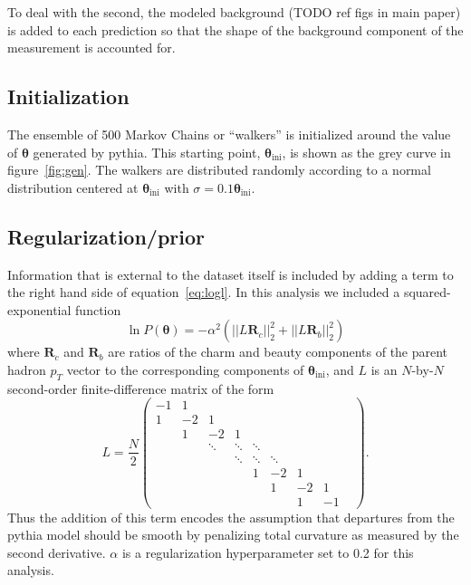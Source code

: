 \documentclass[12pt]{article}
\newcommand{\rvec}{\mathbf{R}}
\newcommand{\thetavec}{\mathbf{\theta}}
\newcommand{\prior}{P(\thetavec)}
\begin{document}
To deal with the second, the modeled background (TODO ref figs in main paper) is added to each prediction so that the shape of the background component of the measurement is accounted for.

\subsection{Initialization} \label{sec:mcmc-init}
The ensemble of 500 Markov Chains or ``walkers'' is initialized around the value of $\thetavec$ generated by pythia. This starting point, $\thetavec_{\mathrm{ini}}$, is shown as the grey curve in figure~\ref{fig:gen}. The walkers are distributed randomly according to a normal distribution centered at $\thetavec_{\mathrm{ini}}$ with $\sigma = 0.1 \thetavec_{\mathrm{ini}}$.

\subsection{Regularization/prior}
Information that is external to the dataset itself is included by adding a term to the right hand side of equation~\ref{eq:logl}. In this analysis we included a squared-exponential function
\begin{equation} \label{eq:l2reg}
  \ln \prior = -\alpha^2 \left(||L \rvec_c||_2^2 + ||L \rvec_b||_2^2\right)
\end{equation}
where $\rvec_c$ and $\rvec_b$ are ratios of the charm and beauty components of the parent hadron $p_T$ vector to the corresponding components of $\thetavec_{\mathrm{ini}}$, and $L$ is an $N$-by-$N$ second-order finite-difference matrix of the form
\begin{equation} \label{eq:lmatrix}
L = \frac{N}{2}
\begin{pmatrix}
-1 & 1 & & & & & &\\
1 & -2 & 1 & & & & &\\
& 1 & -2 & 1 & & & &\\

& & \ddots & \ddots & \ddots & & & &\\
& & & \ddots & \ddots & \ddots & & & \\

& & & & 1 & -2 & 1 &\\
& & & & & 1 & -2 & 1\\
& & & & & & 1 & -1
\end{pmatrix}.
\end{equation}
Thus the addition of this term encodes the assumption that departures from the pythia model should be smooth by penalizing total curvature as measured by the second derivative. $\alpha$ is a regularization hyperparameter set to 0.2 for this analysis.
\end{document}
